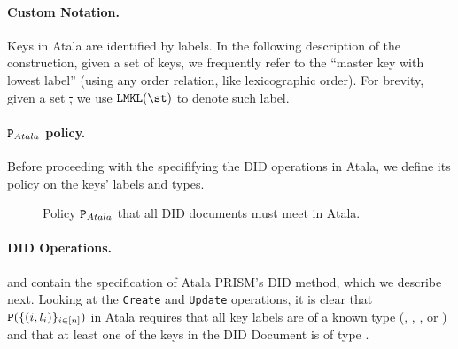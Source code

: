 \paragraph{Custom Notation.} %
Keys in Atala are identified by labels. In the following description of the
\RealPKIDIDAtala construction, given a set of keys, we frequently refer to the
``master key with lowest label'' (using any order relation, like lexicographic
order).  For brevity, given a set \st, we use $\LMKL(\st)$ to denote such label.

\paragraph{$\P_{Atala}$ policy.} %
Before proceeding with the specififying the DID operations in Atala, we define
its policy on the keys' labels and types.

\begin{figure}[ht]
  \centering
  \caption{Policy $\P_{Atala}$ that all DID documents must meet in Atala.}
\end{figure}

\paragraph{DID Operations.} %
 and  contain the
specification of Atala PRISM's DID method,
which we describe next. Looking at the \texttt{Create} and \texttt{Update}
operations, it is clear that $\P(\lbrace (i, \lbl_i) \rbrace_{i\in[n]})$ in
Atala requires that all key labels are of a known type (\MasterKey, \IssueKey,
\CommKey, or \AuthKey) and that at least one of the keys in the DID Document
is of type \MasterKey.

